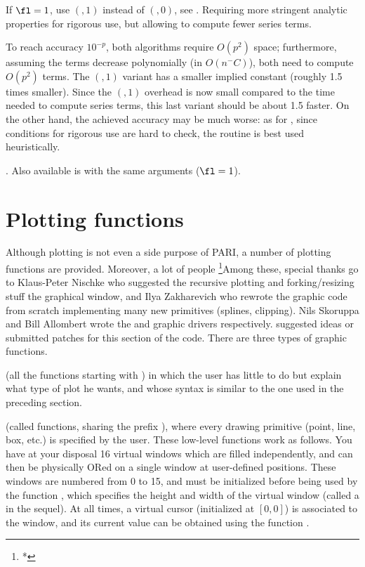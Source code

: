If $\fl=1$, use $(,1)$ instead of $(,0)$, see
. Requiring more stringent analytic properties for
rigorous use, but allowing to compute fewer series terms.

To reach accuracy $10^{-p}$, both algorithms require $O(p^2)$ space;
furthermore, assuming the terms decrease polynomially (in $O(n^-C)$), both
need to compute $O(p^2)$ terms. The $(,1)$ variant has a smaller
implied constant (roughly 1.5 times smaller). Since the $(,1)$
overhead is now small compared to the time needed to compute series terms,
this last variant should be about 1.5 faster. On the other hand, the
achieved accuracy may be much worse: as for , since
conditions for rigorous use are hard to check, the routine is best used
heuristically.

. Also
available is  with the same arguments ($\fl = 1$).

\section{Plotting functions}

  Although plotting is not even a side purpose of PARI, a number of plotting
functions are provided. Moreover, a lot of people
\footnote{*}{Among these, special thanks go to Klaus-Peter Nischke who
suggested the recursive plotting and forking/resizing stuff the graphical
window, and Ilya Zakharevich who rewrote the graphic code from scratch
implementing many new primitives (splines, clipping). Nils Skoruppa and Bill
Allombert wrote the  and  graphic drivers respectively.}
suggested ideas or submitted patches for this section of the code. There are
three types of graphic functions.

 (all the functions starting with
) in which the user has little to do but explain what type of plot
he wants, and whose syntax is similar to the one used in the preceding
section.

 (called  functions,
sharing the prefix ), where every drawing primitive (point, line,
box, etc.) is specified by the user. These low-level functions work as
follows. You have at your disposal 16 virtual windows which are filled
independently, and can then be physically ORed on a single window at
user-defined positions. These windows are numbered from 0 to 15, and must be
initialized before being used by the function , which specifies
the height and width of the virtual window (called a  in the
sequel). At all times, a virtual cursor (initialized at $[0,0]$) is associated
to the window, and its current value can be obtained using the function
.

